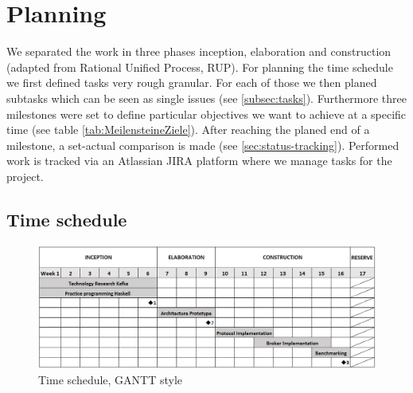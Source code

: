 
\newpage
\section{Planning}
We separated the work in three phases inception, elaboration and construction
(adapted from Rational Unified Process, RUP). For planning the time schedule we
first defined tasks very rough granular. For each of those we then planed
subtasks which can be seen as single issues (see \ref{subsec:tasks}).
Furthermore three milestones were set to define particular objectives we want to
achieve at a specific time (see table \ref{tab:MeilensteineZiele}).  After reaching the
planed end of a milestone, a set-actual comparison is made (see
\ref{sec:status-tracking}). Performed work is
tracked via an Atlassian JIRA platform where we manage tasks for the project. 


\subsection{Time schedule}
\begin{figure}[H]
    \centering
    \includegraphics[width=1\textwidth]{images/workschedule.png}
    \caption{Time schedule, GANTT style}
    \label{fig:workschedule}
\end{figure}

